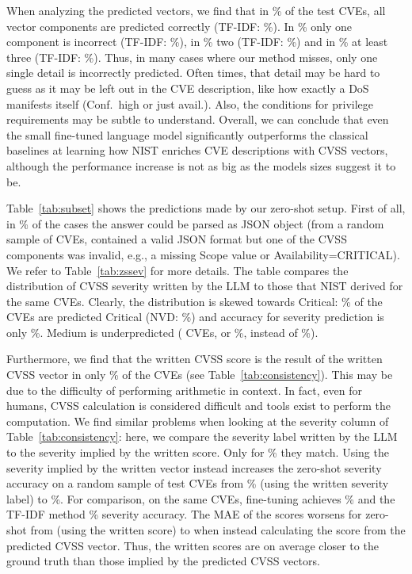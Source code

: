 When analyzing the predicted vectors, we find that in \nLoRAfVecZero\% of the test CVEs, all vector components are predicted correctly (TF-IDF: \nLRfVecZero\%).
In \nLoRAfVecOne\% only one component is incorrect (TF-IDF: \nLRfVecOne\%), in \nLoRAfVecTwo\% two (TF-IDF: \nLRfVecTwo\%) and in \nLoRAfVecThreePlus\% at least three (TF-IDF: \nLRfVecThreePlus\%).
Thus, in many cases where our method misses, only one single detail is incorrectly predicted.
Often times, that detail may be hard to guess as it may be left out in the CVE description, like how exactly a DoS manifests itself (Conf.\ high or just avail.).
Also, the conditions for privilege requirements may be subtle to understand.
Overall, we can conclude that even the small fine-tuned language model significantly outperforms the classical baselines at learning how NIST enriches CVE descriptions with CVSS vectors, although the performance increase is not as big as the models sizes suggest it to be.



Table~\ref{tab:subset} shows the predictions made by our zero-shot setup.
First of all, in \nZSParse\% of the cases the answer could be parsed as JSON object (from a random sample of \nSub{} CVEs, \nZSInvalid{} contained a valid JSON format but one of the CVSS components was invalid, e.g., a missing Scope value or Availability=CRITICAL).
We refer to Table~\ref{tab:zssev} for more details.
The table compares the distribution of CVSS severity written by the LLM to those that NIST derived for the same CVEs.
Clearly, the distribution is skewed towards Critical: \nZSCritShare\% of the CVEs are predicted Critical (NVD: \nSubCritShare\%) and accuracy for severity prediction is only \nZSdSev\%.
Medium is underpredicted (\nZSMediumCount{} CVEs, or \nZSMediumShare\%, instead of \nSubMediumShare\%).

Furthermore, we find that the written CVSS score is the result of the written CVSS vector in only \nZSScoreCons\% of the CVEs (see Table~\ref{tab:consistency}).
This may be due to the difficulty of performing arithmetic in context.
In fact, even for humans, CVSS calculation is considered difficult and tools exist to perform the computation.
We find similar problems when looking at the severity column of Table~\ref{tab:consistency}: here, we compare the severity label written by the LLM to the severity implied by the written score.
Only for \nZSSevCons\% they match.
Using the severity implied by the written vector instead increases the zero-shot severity accuracy on a random sample of \nSub{} test CVEs from \nZSdSev\% (using the written severity label) to \nZSfSev\%.
For comparison, on the same CVEs, fine-tuning achieves \nLoRAfSubSev\% and the TF-IDF method \nLRfSubSev\% severity accuracy.
The MAE of the scores worsens for zero-shot from \nZSdMae{} (using the written score) to \nZSfMae{} when instead calculating the score from the predicted CVSS vector.
Thus, the written scores are on average closer to the ground truth than those implied by the predicted CVSS vectors.


